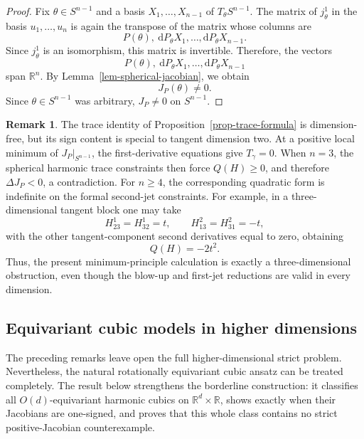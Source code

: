 \documentclass[10pt]{amsart}
\numberwithin{equation}{section}
\theoremstyle{definition}
\newtheorem{remark}{Remark}[section]
\newcommand{\R}{\mathbb R}
\begin{document}
\begin{proof}
Fix \(\theta\in S^{n-1}\) and a basis
\(X_1,\ldots,X_{n-1}\) of \(T_\theta S^{n-1}\). The matrix of \(j^1_\theta\)
in the basis \(u_1,\ldots,u_n\) is again the transpose of the matrix whose
columns are
\[
        P(\theta),\ \mathrm{d}P_\theta X_1,\ldots,\mathrm{d}P_\theta X_{n-1}.
\]
Since \(j^1_\theta\) is an isomorphism, this matrix is invertible. Therefore,
the vectors
\[
        P(\theta),\ \mathrm{d}P_\theta X_1,\ldots,\mathrm{d}P_\theta X_{n-1}
\]
span \(\R^n\). By Lemma~\ref{lem-spherical-jacobian}, we obtain
\[
        J_P(\theta)\ne0.
\]
Since \(\theta\in S^{n-1}\) was arbitrary, \(J_P\ne0\) on \(S^{n-1}\).
\end{proof}

\begin{remark}
The trace identity of Proposition~\ref{prop-trace-formula} is
dimension-free, but its sign content is special to tangent dimension two. At
a positive local minimum of \(J_P|_{S^{n-1}}\), the first-derivative equations
give \(T_\gamma=0\). When \(n=3\), the spherical harmonic trace constraints
then force \(Q(H)\ge0\), and therefore \(\Delta J_P<0\), a contradiction. For
\(n\ge4\), the corresponding quadratic form is indefinite on the formal
second-jet constraints. For example, in a three-dimensional tangent block one
may take
\[
        H^1_{23}=H^1_{32}=t,
        \qquad
        H^2_{13}=H^2_{31}=-t,
\]
with the other tangent-component second derivatives equal to zero, obtaining
\[
        Q(H)=-2t^2.
\]
Thus, the present minimum-principle calculation is exactly a
three-dimensional obstruction, even though the blow-up and first-jet
reductions are valid in every dimension.
\end{remark}


\subsection{Equivariant cubic models in higher dimensions}

The preceding remarks leave open the full higher-dimensional strict problem.
Nevertheless, the natural rotationally equivariant cubic ansatz can be treated
completely. The result below strengthens the borderline construction: it
classifies all \(O(d)\)-equivariant harmonic cubics on \(\R^d\times\R\), shows
exactly when their Jacobians are one-signed, and proves that this whole class
contains no strict positive-Jacobian counterexample.
\end{document}
